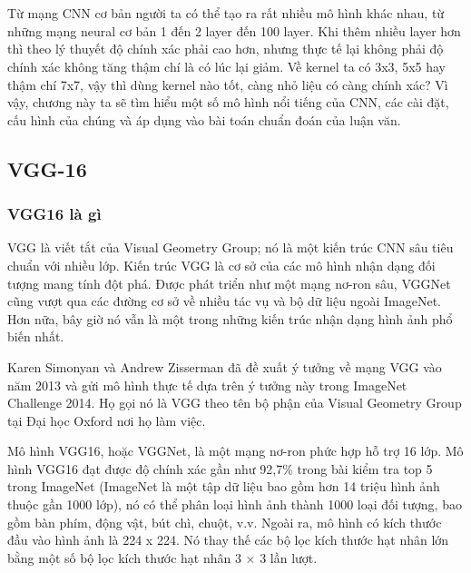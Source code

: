 \setcounter{chapter}{1}
\setcounter{section}{1}
\chapter{\tenchuongii}
Từ mạng CNN cơ bản người ta có thể tạo ra rất nhiều mô hình khác nhau, từ những mạng neural cơ bản 1 đến 2 layer đến 100 layer. Khi thêm nhiều layer hơn thì theo lý thuyết độ chính xác phải cao hơn, nhưng thực tế lại không phải độ chính xác không tăng thậm chí là có lúc lại giảm. Về kernel ta có 3x3, 5x5 hay thậm chí 7x7, vậy thì dùng kernel nào tốt, càng nhỏ liệu có càng chính xác? Vì vậy, chương này ta sẽ tìm hiểu một số mô hình nổi tiếng của CNN, các cài đặt, cấu hình của chúng và áp dụng vào bài toán chuẩn đoán của luận văn.
\section{VGG-16}

\subsection{VGG16 là gì}
VGG là viết tắt của Visual Geometry Group; nó là một kiến trúc CNN sâu tiêu chuẩn với nhiều lớp. Kiến trúc VGG là cơ sở của các mô hình nhận dạng đối tượng mang tính đột phá. Được phát triển như một mạng nơ-ron sâu, VGGNet cũng vượt qua các đường cơ sở về nhiều tác vụ và bộ dữ liệu ngoài ImageNet. Hơn nữa, bây giờ nó vẫn là một trong những kiến trúc nhận dạng hình ảnh phổ biến nhất.

Karen Simonyan và Andrew Zisserman \cite{vgg16} đã đề xuất ý tưởng về mạng VGG vào năm 2013 và gửi mô hình thực tế dựa trên ý tưởng này trong ImageNet Challenge 2014. Họ gọi nó là VGG theo tên bộ phận của Visual Geometry Group tại Đại học Oxford nơi họ làm việc.

Mô hình VGG16, hoặc VGGNet, là một mạng nơ-ron phức hợp hỗ trợ 16 lớp. Mô hình VGG16 đạt được độ chính xác gần như 92,7\% trong bài kiểm tra top 5 trong ImageNet (ImageNet là một tập dữ liệu bao gồm hơn 14 triệu hình ảnh thuộc gần 1000 lớp), nó có thể phân loại hình ảnh thành 1000 loại đối tượng, bao gồm bàn phím, động vật, bút chì, chuột, v.v. Ngoài ra, mô hình có kích thước đầu vào hình ảnh là 224 x 224. Nó thay thế các bộ lọc kích thước hạt nhân lớn bằng một số bộ lọc kích thước hạt nhân 3 × 3 lần lượt.

